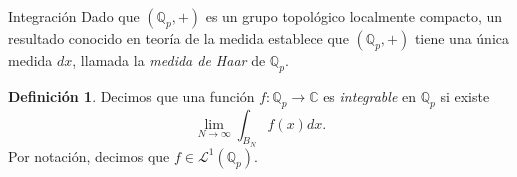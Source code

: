 \documentclass{beamer}
\theoremstyle{definition}
\numberwithin{equation}{section}
\newcommand{\marine}[1]{\textcolor{defColor}{#1}}
\newtheorem{df}{\marine{Definición}}
\newcommand{\C}{\mathbb{C}}
\newcommand{\Qp}{\mathbb{Q}_p}
\begin{document}
\begin{frame}{Integración}
	Dado que $ (\Qp, +)$ es un grupo topológico localmente compacto, un resultado conocido en teoría de la medida establece que $ (\Qp, +)$ tiene
	una única medida $dx$, llamada la \textit{medida de Haar}	de $\Qp$.
	\begin{df}
		Decimos que una función $f\colon\Qp\to\C$  es \textit{integrable} en $\Qp$ si existe 
		$$\lim _{N \rightarrow \infty} \int_{B_{N}} f (x) dx.$$
		Por notación, decimos que $f\in\mathcal{L}^1(\Qp)$.
		
		
	\end{df}
\end{frame}
\end{document}

